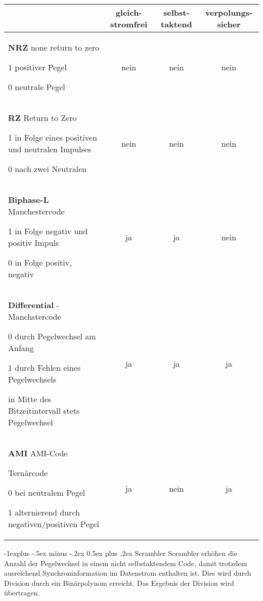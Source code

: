 \documentclass[10pt,landscape]{article}
\makeatletter
\renewcommand{\subsection}{\@startsection{subsection}{2}{0mm}%
                                {-1explus -.5ex minus -.2ex}%
                                {0.5ex plus .2ex}%
                                {\normalfont\normalsize\bfseries}}
\makeatother
\begin{document}
\begin{multicols}{3}
    \begin{tabular}{ p{3cm} | c | c | c }
                                                                            & gleich-stromfrei & selbst-taktend & verpolungs-sicher \\\hline
        \textbf{NRZ} none return to zero \begin{itemize*} \item 1 positiver Pegel \item 0 neutrale Pegel \end{itemize*}     & nein             & nein           & nein              \\
        \textbf{RZ} Return to Zero \begin{itemize*} \item 1 in Folge eines positiven und neutralen Impulses \item 0 nach zwei Neutralen \end{itemize*}           & nein             & nein           & nein              \\
        \textbf{Biphase-L} Manchestercode \begin{itemize*} \item 1 in Folge negativ und positiv Impuls \item 0 in Folge positiv, negativ \end{itemize*}    & ja               & ja             & nein              \\
        \textbf{Differential} -Manchstercode \begin{itemize*} \item 0 durch Pegelwechsel am Anfang \item 1 durch Fehlen eines Pegelwechsels \item in Mitte des Bitzeitintervall stets Pegelwechsel \end{itemize*} & ja               & ja             & ja                \\
        \textbf{AMI} AMI-Code \begin{itemize*} \item Ternärcode \item 0 bei neutralem Pegel \item 1 alternierend durch negativen/positiven Pegel \end{itemize*}                & ja               & nein           & ja
    \end{tabular}
    
    \subsection{Scrambler}
    Scrambler erhöhen die Anzahl der Pegelwechsel in einem nicht selbstaktendem Code, damit trotzdem ausreichend Synchroninformation im Datenstrom enthalten ist. Dies wird durch Division durch ein Binärpolynom erreicht. Das Ergebnis der Division wird übertragen.
    

\end{multicols}
\end{document}
